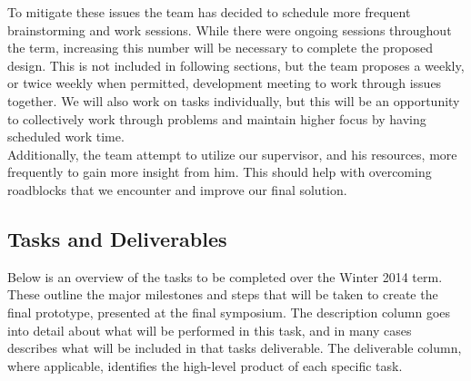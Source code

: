 \documentclass{article}
\begin{document}
To mitigate these issues the team has decided to schedule more frequent brainstorming and work sessions.
While there were ongoing sessions throughout the term, increasing this number will be necessary to complete the proposed design.
This is not included in following sections, but the team proposes a weekly, or twice weekly when permitted, development meeting to work through issues together.
We will also work on tasks individually, but this will be an opportunity to collectively work through problems and maintain higher focus by having scheduled work time.\\

Additionally, the team attempt to utilize our supervisor, and his resources, more frequently to gain more insight from him.
This should help with overcoming roadblocks that we encounter and improve our final solution.\\

\subsection{Tasks and Deliverables}

Below is an overview of the tasks to be completed over the Winter 2014 term.
These outline the major milestones and steps that will be taken to create the final prototype, presented at the final symposium.
The description column goes into detail about what will be performed in this task, and in many cases describes what will be included in that tasks deliverable.
The deliverable column, where applicable, identifies the high-level product of each specific task.\\
\end{document}
